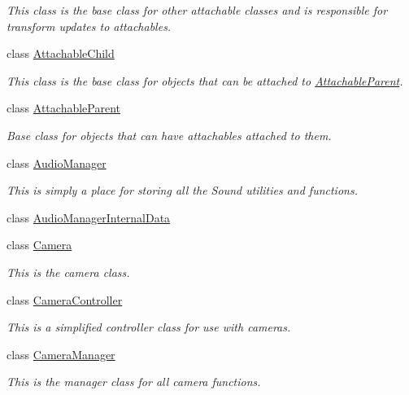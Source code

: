 \begin{DoxyCompactItemize}
\begin{DoxyCompactList}\small\item\em This class is the base class for other attachable classes and is responsible for transform updates to attachables. \end{DoxyCompactList}\item 
class \hyperlink{classMezzanine_1_1AttachableChild}{Attachable\-Child}
\begin{DoxyCompactList}\small\item\em This class is the base class for objects that can be attached to \hyperlink{classMezzanine_1_1AttachableParent}{Attachable\-Parent}. \end{DoxyCompactList}\item 
class \hyperlink{classMezzanine_1_1AttachableParent}{Attachable\-Parent}
\begin{DoxyCompactList}\small\item\em Base class for objects that can have attachables attached to them. \end{DoxyCompactList}\item 
class \hyperlink{classMezzanine_1_1AudioManager}{Audio\-Manager}
\begin{DoxyCompactList}\small\item\em This is simply a place for storing all the Sound utilities and functions. \end{DoxyCompactList}\item 
class \hyperlink{classMezzanine_1_1AudioManagerInternalData}{Audio\-Manager\-Internal\-Data}
\item 
class \hyperlink{classMezzanine_1_1Camera}{Camera}
\begin{DoxyCompactList}\small\item\em This is the camera class. \end{DoxyCompactList}\item 
class \hyperlink{classMezzanine_1_1CameraController}{Camera\-Controller}
\begin{DoxyCompactList}\small\item\em This is a simplified controller class for use with cameras. \end{DoxyCompactList}\item 
class \hyperlink{classMezzanine_1_1CameraManager}{Camera\-Manager}
\begin{DoxyCompactList}\small\item\em This is the manager class for all camera functions. \end{DoxyCompactList}\item 

\end{DoxyCompactItemize}

